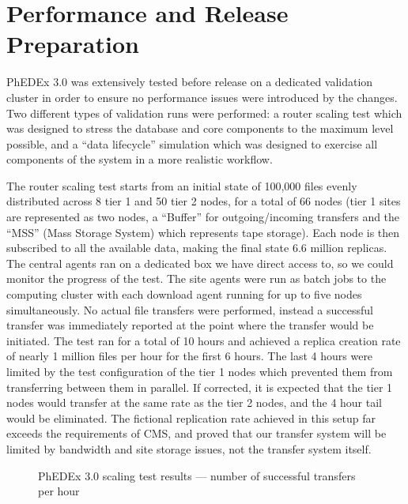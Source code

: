 \documentclass{PoS}
\begin{document}
\section{Performance and Release Preparation}

PhEDEx 3.0 was extensively tested before release on a dedicated
validation cluster in order to ensure no performance issues were
introduced by the changes.  Two different types of validation runs
were performed: a router scaling test which was designed to stress the
database and core components to the maximum level possible, and a
``data lifecycle'' simulation which was designed to exercise all
components of the system in a more realistic workflow.

The router scaling test starts from an initial state of 100,000 files
evenly distributed across 8 tier 1 and 50 tier 2 nodes, for a total of
66 nodes (tier 1 sites are represented as two nodes, a ``Buffer'' for
outgoing/incoming transfers and the ``MSS'' (Mass Storage System)
which represents tape storage).  Each node is then subscribed to all
the available data, making the final state 6.6 million replicas.  The
central agents ran on a dedicated box we have direct access to, so we
could monitor the progress of the test.  The site agents were run as
batch jobs to the computing cluster with each download agent running
for up to five nodes simultaneously.  No actual file transfers were
performed, instead a successful transfer was immediately reported at
the point where the transfer would be initiated.  The test ran for a
total of 10 hours and achieved a replica creation rate of nearly 1
million files per hour for the first 6 hours.  The last 4 hours were
limited by the test configuration of the tier 1 nodes which prevented
them from transferring between them in parallel.  If corrected, it is
expected that the tier 1 nodes would transfer at the same rate as the
tier 2 nodes, and the 4 hour tail would be eliminated.  The fictional
replication rate achieved in this setup far exceeds the requirements
of CMS, and proved that our transfer system will be limited by
bandwidth and site storage issues, not the transfer system itself.

\begin{figure}[htp] 
\centering
\setlength\fboxsep{0pt} 
\setlength\fboxrule{0.5pt} 
\caption{PhEDEx 3.0 scaling test results --- number of successful transfers per hour}
\label{fig:scaling08}
\end{figure} 
\end{document}

